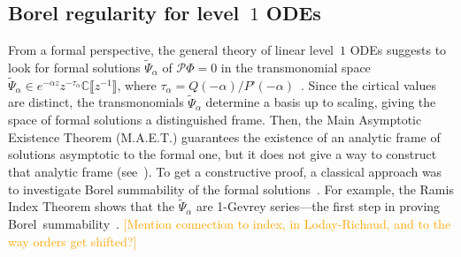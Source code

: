 \documentclass{article}
\let\Re\relax
\DeclareMathOperator{\Re}{Re}
\newcommand{\C}{\mathbb{C}}
\newcommand{\series}[1]{\tilde{#1}}
\newcommand*{\defeq}{\mathrel{\vcenter{\baselineskip0.5ex \lineskiplimit0pt
                     \hbox{\scriptsize.}\hbox{\scriptsize.}}}%
                     =}
\newcommand{\borel}{\mathcal{B}}
\theoremstyle{definition}
\theoremstyle{plain}
\begin{document}
\subsection{Borel regularity for level~$1$ ODEs}
%
From a formal perspective, the general theory of linear level~$1$ ODEs suggests to look for formal solutions $\tilde{\Psi}_\alpha$ of $\mathcal{P}\Phi=0$ in the transmonomial space $\tilde{\Psi}_\alpha\in e^{-\alpha z} z^{-\tau_\alpha}\C\llbracket z^{-1}\rrbracket$, where $\tau_\alpha=Q(-\alpha)/P’(-\alpha)$~\cite{int-irreg}\cite[Proposition~2.2.7, p.~111]{EcalleIII}. Since the cirtical values are distinct, the transmonomials $\tilde{\Psi}_\alpha$ determine a basis up to scaling, giving the space of formal solutions a distinguished frame. Then, the Main Asymptotic Existence Theorem (M.A.E.T.) guarantees the existence of an analytic frame of solutions asymptotic to the formal one, but it  does not give a way to construct that analytic frame (see~\cite[Chapter 14]{balser}). To get a constructive proof, a classical approach was to investigate Borel summability of the formal solutions~\cite{loday-Remy2011,diverg-resurg--ii,malgrange--fourier,malgrange1995sommation,malgrange92,ramis1991series}. For example, the Ramis Index Theorem shows that the $\tilde{\Psi}_\alpha$ are 1-Gevrey series---the first step in proving Borel~summability~\cite{ramis_index}. \textcolor{orange}{[Mention connection to index, in Loday-Richaud, and to the way orders get shifted?]}
\end{document}
